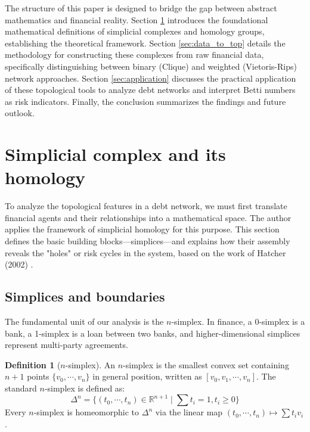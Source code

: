 \documentclass[12pt,reqno]{amsart}
\theoremstyle{definition}
\newtheorem{definition}[theorem]{Definition}
\numberwithin{equation}{section}
\begin{document}
    The structure of this paper is designed to bridge the gap between abstract mathematics and financial reality. Section \ref{homology} introduces the foundational mathematical definitions of simplicial complexes and homology groups, establishing the theoretical framework. Section \ref{sec:data_to_top} details the methodology for constructing these complexes from raw financial data, specifically distinguishing between binary (Clique) and weighted (Vietoris-Rips) network approaches. Section \ref{sec:application} discusses the practical application of these topological tools to analyze debt networks and interpret Betti numbers as risk indicators. Finally, the conclusion summarizes the findings and future outlook.

    \section{Simplicial complex and its homology}\label{homology}

    To analyze the topological features in a debt network, we must first translate financial agents and their relationships into a mathematical space. The author applies the framework of simplicial homology for this purpose. This section defines the basic building blocks—simplices—and explains how their assembly reveals the "holes" or risk cycles in the system, based on the work of Hatcher (2002) \cite{Hat02}.
    
    \subsection{Simplices and boundaries}\label{sec:simplices}
    The fundamental unit of our analysis is the $n$-simplex. In finance, a 0-simplex is a bank, a 1-simplex is a loan between two banks, and higher-dimensional simplices represent multi-party agreements.

    \begin{definition}[$n$-simplex]
    An $n$-simplex is the smallest convex set containing $n+1$ points $\{v_0,\cdots,v_n\}$ in general position, written as $[v_0,v_1,\cdots,v_n]$. The standard $n$-simplex is defined as:
    \begin{equation}
        \Delta^n=\{(t_0,\cdots,t_n)\in\mathbb{R}^{n+1} \mid \sum t_i=1,t_i\ge0\}
    \end{equation}
    Every $n$-simplex is homeomorphic to $\Delta^n$ via the linear map $(t_0,\cdots,t_n)\mapsto\sum t_iv_i$.
    \end{definition}
\end{document}
